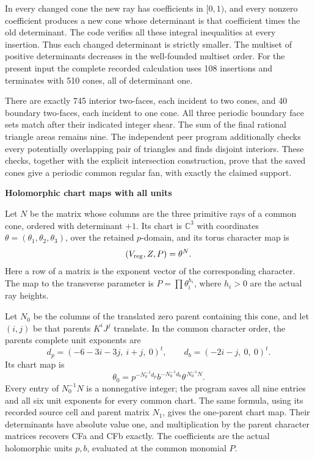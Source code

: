In every changed cone the new ray has coefficients in \([0,1)\), and every nonzero coefficient produces a new cone whose determinant is that coefficient times the old determinant. The code verifies all these integral inequalities at every insertion. Thus each changed determinant is strictly smaller. The multiset of positive determinants decreases in the well-founded multiset order. For the present input the complete recorded calculation uses 108 insertions and terminates with 510 cones, all of determinant one.

There are exactly 745 interior two-faces, each incident to two cones, and 40 boundary two-faces, each incident to one cone. All three periodic boundary face sets match after their indicated integer shear. The sum of the final rational triangle areas remains nine. The independent peer program additionally checks every potentially overlapping pair of triangles and finds disjoint interiors. These checks, together with the explicit intersection construction, prove that the saved cones give a periodic common regular fan, with exactly the claimed support.

\par

\medskip\noindent\textbf{Holomorphic chart maps with all units}

\par\nobreak

Let \(N\) be the matrix whose columns are the three primitive rays of a common cone, ordered with determinant \(+1\). Its chart is \(\mathbb C^3\) with coordinates \(\theta=(\theta_1,\theta_2,\theta_3)\), over the retained \(p\)-domain, and its torus character map is
\[
 (V_{\rm reg},Z,P)=\theta^N.
\]
Here a row of a matrix is the exponent vector of the corresponding character. The map to the transverse parameter is \(P=\prod\theta_i^{h_i}\), where \(h_i>0\) are the actual ray heights.

Let \(N_0\) be the columns of the translated zero parent containing this cone, and let \((i,j)\) be that parent\textquotesingle s \(K^iJ^j\) translate. In the common character order, the parent\textquotesingle s complete unit exponents are
\[
 d_p=(-6-3i-3j,\ i+j,\ 0)^t,\qquad
 d_b=(-2i-j,\ 0,\ 0)^t.                                        \tag{CFe}
\]
Its chart map is
\[
 \theta_0
 =p^{-N_0^{-1}d_p}b^{-N_0^{-1}d_b}
       \theta^{\,N_0^{-1}N}.                                   \tag{CFf}
\]
Every entry of \(N_0^{-1}N\) is a nonnegative integer; the program saves all nine entries and all six unit exponents for every common chart. The same formula, using its recorded source cell and parent matrix \(N_1\), gives the one-parent chart map. Their determinants have absolute value one, and multiplication by the parent character matrices recovers CFa and CFb exactly. The coefficients are the actual holomorphic units \(p,b\), evaluated at the common monomial \(P\).

